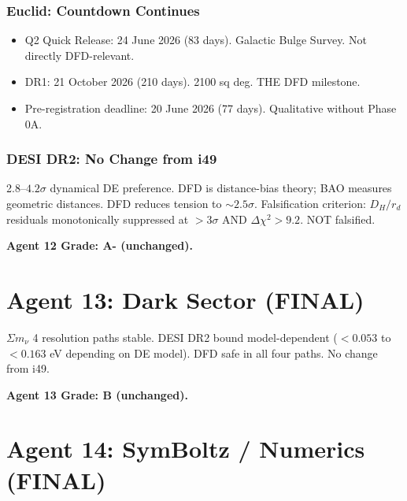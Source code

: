 \documentclass[11pt,a4paper]{article}
\begin{document}
\section{Euclid: Countdown Continues}

\begin{itemize}
\item Q2 Quick Release: 24 June 2026 (83 days). Galactic Bulge Survey. Not directly DFD-relevant.
\item DR1: 21 October 2026 (210 days). 2100 sq deg. THE DFD milestone.
\item Pre-registration deadline: 20 June 2026 (77 days). Qualitative without Phase 0A.
\end{itemize}

\section{DESI DR2: No Change from i49}

2.8--$4.2\sigma$ dynamical DE preference. DFD is distance-bias theory; BAO measures geometric distances. DFD reduces tension to $\sim 2.5\sigma$. Falsification criterion: $D_H/r_d$ residuals monotonically suppressed at $> 3\sigma$ AND $\Delta\chi^2 > 9.2$. NOT falsified.

\textbf{Agent 12 Grade: A- (unchanged).}


\part{Agent 13: Dark Sector (FINAL)}
\label{part:agent13}

$\Sigma m_\nu$ 4 resolution paths stable. DESI DR2 bound model-dependent ($< 0.053$ to $< 0.163$ eV depending on DE model). DFD safe in all four paths. No change from i49.

\textbf{Agent 13 Grade: B (unchanged).}


\part{Agent 14: SymBoltz / Numerics (FINAL)}
\label{part:agent14}
\end{document}
